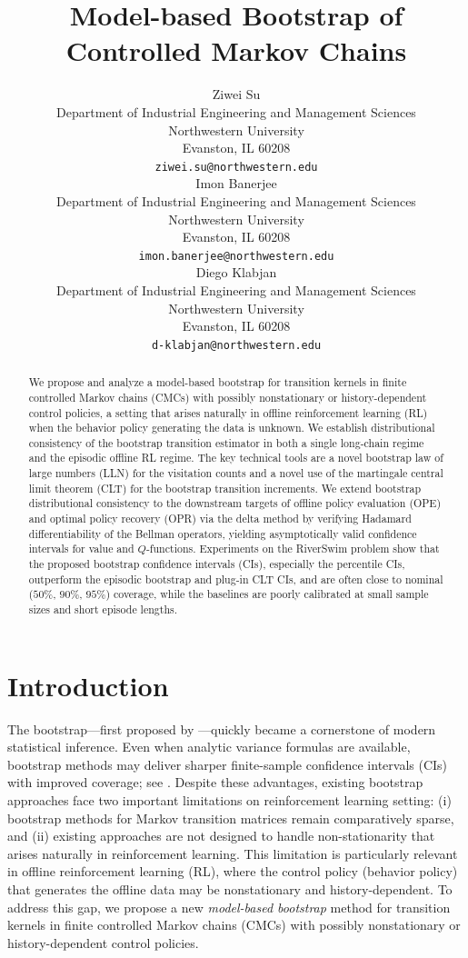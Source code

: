 \documentclass{article}
\title{Model-based Bootstrap of Controlled Markov Chains}
\author{%
  Ziwei Su\\
  Department of Industrial Engineering and Management Sciences\\
  Northwestern University\\
  Evanston, IL 60208 \\
  \texttt{ziwei.su@northwestern.edu} \\
  \And
  Imon Banerjee \\
  Department of Industrial Engineering and Management Sciences\\
  Northwestern University\\
  Evanston, IL 60208 \\
  \texttt{imon.banerjee@northwestern.edu} \\
  \AND
  Diego Klabjan \\
  Department of Industrial Engineering and Management Sciences\\
  Northwestern University\\
  Evanston, IL 60208 \\
  \texttt{d-klabjan@northwestern.edu}\\
}
\numberwithin{equation}{section}
\begin{document}
\maketitle


\begin{abstract}
We propose and analyze a model-based bootstrap for transition kernels in finite controlled Markov chains (CMCs) with possibly nonstationary or history-dependent control policies, a setting that arises naturally in offline reinforcement learning (RL) when the behavior policy generating the data is unknown.
We establish distributional consistency of the bootstrap transition estimator in both a single long-chain regime and the episodic offline RL regime.
The key technical tools are a novel bootstrap law of large numbers (LLN) for the visitation counts and a novel use of the martingale central limit theorem (CLT) for the bootstrap transition increments.
We extend bootstrap distributional consistency to the downstream targets of offline policy evaluation (OPE) and optimal policy recovery (OPR) via the delta method by verifying Hadamard differentiability of the Bellman operators, yielding asymptotically valid confidence intervals for value and $Q$-functions.
Experiments on the RiverSwim problem show that the proposed bootstrap confidence intervals (CIs), especially the percentile CIs, outperform the episodic bootstrap and plug-in CLT CIs, and are often close to nominal ($50\%$, $90\%$, $95\%$) coverage, while the baselines are poorly calibrated at small sample sizes and short episode lengths.
\end{abstract}


\section{Introduction}
\label{sec:introduction}
The bootstrap—first proposed by \citet{efron1979bootstrap}—quickly became a cornerstone of modern statistical inference. 
Even when analytic variance formulas are available, bootstrap methods may deliver sharper finite-sample confidence intervals (CIs) with improved coverage; see \citet[p.~14]{hall2013bootstrap}. 
Despite these advantages, existing bootstrap approaches face two important limitations on reinforcement learning setting: (i) bootstrap methods for Markov transition matrices remain comparatively sparse, and (ii) existing approaches are not designed to handle non-stationarity that arises naturally in reinforcement learning.
This limitation is particularly relevant in offline reinforcement learning (RL), where the control policy (behavior policy) that generates the offline data may be nonstationary and history-dependent.
To address this gap, we propose a new \emph{model-based bootstrap} method for transition kernels in finite controlled Markov chains (CMCs) with possibly nonstationary or history-dependent control policies.
\end{document}
